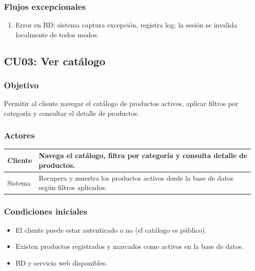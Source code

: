 \documentclass[12pt,a4paper]{article}
\begin{document}
\subsubsection*{Flujos excepcionales}
\begin{enumerate}[label=FE-\arabic*]
    \item Error en BD: sistema captura excepción, registra log; la sesión se invalida localmente de todos modos.
\end{enumerate}


\subsection{CU03: Ver catálogo}
\subsubsection*{Objetivo}
Permitir al cliente navegar el catálogo de productos activos, aplicar filtros por categoría y consultar el detalle de productos.

\subsubsection*{Actores}
\begin{longtable}{|l|p{10cm}|}
    \hline
    Cliente & Navega el catálogo, filtra por categoría y consulta detalle de productos.                \\ \hline
    Sistema & Recupera y muestra los productos activos desde la base de datos según filtros aplicados. \\ \hline
\end{longtable}

\subsubsection*{Condiciones iniciales}
\begin{itemize}[label=--]
    \item El cliente puede estar autenticado o no (el catálogo es público).
    \item Existen productos registrados y marcados como activos en la base de datos.
    \item BD y servicio web disponibles.
\end{itemize}
\end{document}
